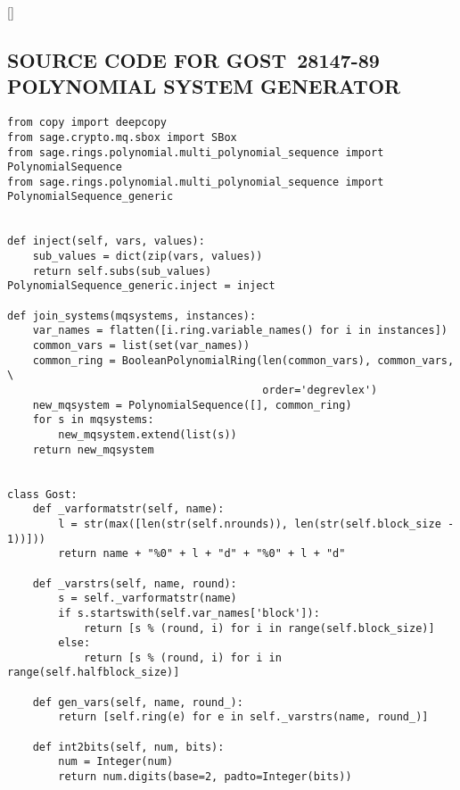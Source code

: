 % 
% 

\titleformat{\chapter}[display]{\center\normalfont\normalsize}{\chaptertitlename\hspace{1em}\thechapter}{1pc}{\MakeUppercase}[\thispagestyle{myheadings}]

\begin{appendices}


\chapter{SOURCE CODE FOR \mbox{GOST~28147-89} POLYNOMIAL SYSTEM GENERATOR}

\begin{lstlisting}
from copy import deepcopy
from sage.crypto.mq.sbox import SBox
from sage.rings.polynomial.multi_polynomial_sequence import PolynomialSequence
from sage.rings.polynomial.multi_polynomial_sequence import PolynomialSequence_generic


def inject(self, vars, values):
    sub_values = dict(zip(vars, values))
    return self.subs(sub_values)
PolynomialSequence_generic.inject = inject

def join_systems(mqsystems, instances):
    var_names = flatten([i.ring.variable_names() for i in instances])
    common_vars = list(set(var_names))
    common_ring = BooleanPolynomialRing(len(common_vars), common_vars, \
                                        order='degrevlex')
    new_mqsystem = PolynomialSequence([], common_ring)
    for s in mqsystems:
        new_mqsystem.extend(list(s))
    return new_mqsystem


class Gost:
    def _varformatstr(self, name):
        l = str(max([len(str(self.nrounds)), len(str(self.block_size - 1))]))
        return name + "%0" + l + "d" + "%0" + l + "d"

    def _varstrs(self, name, round):
        s = self._varformatstr(name)
        if s.startswith(self.var_names['block']):
            return [s % (round, i) for i in range(self.block_size)]
        else:
            return [s % (round, i) for i in range(self.halfblock_size)]

    def gen_vars(self, name, round_):
        return [self.ring(e) for e in self._varstrs(name, round_)]

    def int2bits(self, num, bits):
        num = Integer(num)
        return num.digits(base=2, padto=Integer(bits))


\end{lstlisting}
\end{appendices}
